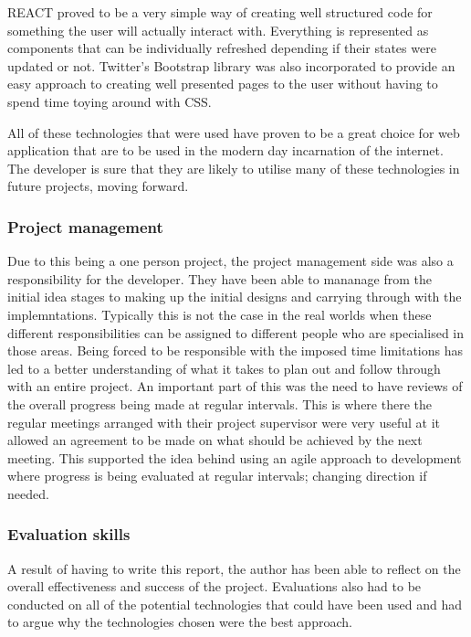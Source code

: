 REACT proved to be a very simple way of creating well structured code for something the user will actually interact with.
Everything is represented as components that can be individually refreshed depending if their states were updated or not.
Twitter's Bootstrap library was also incorporated to provide an easy approach to creating well presented pages to the user without having to spend time
toying around with CSS.

All of these technologies that were used have proven to be a great choice for web application that are to be used in the modern day incarnation of the
internet. 
The developer is sure that they are likely to utilise many of these technologies in future projects, moving forward.


\subsubsection*{Project management}
Due to this being a one person project, the project management side was also a responsibility for the developer.
They have been able to mananage from the initial idea stages to making up the initial designs and carrying through with the implemntations.
Typically this is not the case in the real worlds when these different responsibilities can be assigned to different people who are specialised in 
those areas.
Being forced to be responsible with the imposed time limitations has led to a better understanding of what it takes to plan out and follow through
with an entire project.  
An important part of this was the need to have reviews of the overall progress being made at regular intervals.
This is where there the regular meetings arranged with their project supervisor were very useful at it allowed an agreement to be made on what should 
be achieved by the next meeting.
This supported the idea behind using an agile approach to development where progress is being evaluated at regular intervals; changing direction if 
needed.

\subsubsection*{Evaluation skills}
A result of having to write this report, the author has been able to reflect on the overall effectiveness and success of the project.
Evaluations also had to be conducted on all of the potential technologies that could have been used and had to argue why the technologies chosen 
were the best approach.